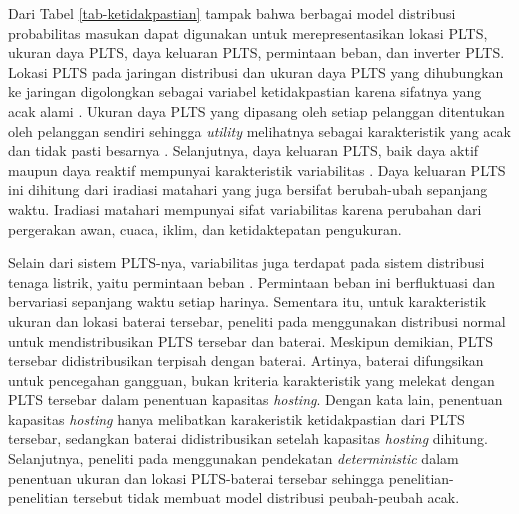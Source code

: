 {Dari Tabel \ref{tab-ketidakpastian} tampak bahwa berbagai model distribusi probabilitas masukan dapat digunakan untuk merepresentasikan lokasi PLTS, ukuran daya PLTS, daya keluaran PLTS, permintaan beban, dan inverter PLTS. Lokasi PLTS pada jaringan distribusi dan ukuran daya PLTS yang dihubungkan ke jaringan digolongkan sebagai variabel ketidakpastian karena sifatnya yang acak alami \cite{Kharrazi2020,Shahnia2011,Dubey2017,Ding2017,Torquato2018}. Ukuran daya PLTS yang dipasang oleh setiap pelanggan ditentukan oleh pelanggan sendiri sehingga \textit{utility} melihatnya sebagai karakteristik yang acak dan tidak pasti besarnya \cite{Shahnia2011,Kharrazi2020,Dubey2017,Ding2017}. Selanjutnya, daya keluaran PLTS, baik daya aktif maupun daya reaktif mempunyai karakteristik variabilitas \cite{Ruiz-Rodriguez2012,Dubey2017,Ding2017,Silva2016}. Daya keluaran PLTS ini dihitung dari iradiasi matahari yang juga bersifat berubah-ubah sepanjang waktu. Iradiasi matahari mempunyai sifat variabilitas karena perubahan dari pergerakan awan, cuaca, iklim, dan ketidaktepatan pengukuran.

Selain dari sistem PLTS-nya, variabilitas juga terdapat pada sistem distribusi tenaga listrik, yaitu permintaan beban \cite{Dubey2017,Ding2017,Torquato2018}. Permintaan beban ini berfluktuasi dan bervariasi sepanjang waktu setiap harinya. Sementara itu, untuk karakteristik ukuran dan lokasi baterai tersebar, peneliti pada \cite{Al-Saffar2020} menggunakan distribusi normal untuk mendistribusikan PLTS tersebar dan baterai. Meskipun demikian, PLTS tersebar didistribusikan terpisah dengan baterai. Artinya, baterai difungsikan untuk pencegahan gangguan, bukan kriteria karakteristik yang melekat dengan PLTS tersebar dalam penentuan kapasitas \textit{hosting}. Dengan kata lain, penentuan kapasitas \textit{hosting} hanya melibatkan karakeristik ketidakpastian dari PLTS tersebar, sedangkan baterai didistribusikan setelah kapasitas \textit{hosting} dihitung. Selanjutnya, peneliti pada \cite{Hashemi2018,Yang2014} menggunakan pendekatan \textit{deterministic} dalam penentuan ukuran dan lokasi PLTS-baterai tersebar sehingga penelitian-penelitian tersebut tidak membuat model distribusi peubah-peubah acak.


}
